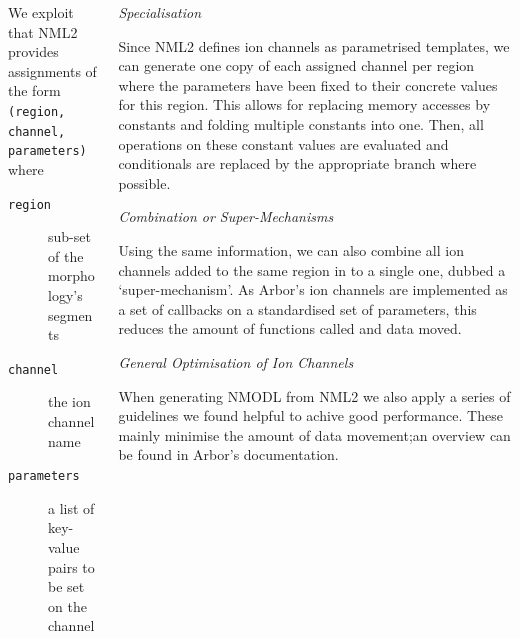 \documentclass{beamer}
\begin{document}
\begin{frame}[t, fragile]
\begin{columns}
\begin{column}{0.49\textwidth}
      We exploit that NML2 provides assignments of the form
      \verb!(region, channel, parameters)! where
      \begin{description}
        \item[\texttt{region}] sub-set of the morphology's segments
        \item[\texttt{channel}] the ion channel name
        \item[\texttt{parameters}] a list of key-value pairs to be set on the channel
      \end{description}
    \end{column}
    \begin{column}{0.49\textwidth}
      \emph{Specialisation}

      Since NML2 defines ion channels as parametrised templates, we can generate
      one copy of each assigned channel per region where the parameters have
      been fixed to their concrete values for this region. This allows for
      replacing memory accesses by constants and folding multiple constants into
      one. Then, all operations on these constant values are evaluated and
      conditionals are replaced by the appropriate branch where possible.

      \vspace*{1ex}
      \emph{Combination or Super-Mechanisms}

      Using the same information, we can also combine all ion channels added to
      the same region in to a single one, dubbed a `super-mechanism'. As Arbor's
      ion channels are implemented as a set of callbacks on a standardised set
      of parameters, this reduces the amount of functions called and data moved.

      \vspace*{1ex}
      \emph{General Optimisation of Ion Channels}

      When generating NMODL from NML2 we also apply a series of guidelines we
      found helpful to achive good performance. These mainly minimise the amount
      of data movement;\@ an overview can be found in Arbor's documentation.
    \end{column}
  \end{columns}
\end{frame}
\end{document}
